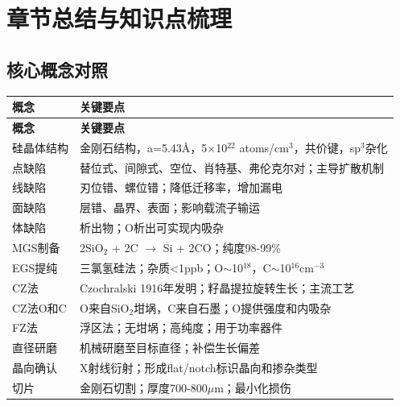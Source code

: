\documentclass[UTF8,12pt,a4paper]{ctexart}
\begin{document}
\section{章节总结与知识点梳理}

\subsection{核心概念对照}

\begin{longtable}{|L{4cm}|L{11cm}|}
\hline
\textbf{概念} & \textbf{关键要点} \\
\hline
\endfirsthead
\hline
\textbf{概念} & \textbf{关键要点} \\
\hline
\endhead
\hline
\endfoot
\hline
\endlastfoot

硅晶体结构 & 金刚石结构，a=5.43\AA，5$\times$10$^{22}$ atoms/cm$^3$，共价键，sp$^3$杂化 \\
\hline

点缺陷 & 替位式、间隙式、空位、肖特基、弗伦克尔对；主导扩散机制 \\
\hline

线缺陷 & 刃位错、螺位错；降低迁移率，增加漏电 \\
\hline

面缺陷 & 层错、晶界、表面；影响载流子输运 \\
\hline

体缺陷 & 析出物；O析出可实现内吸杂 \\
\hline

MGS制备 & 2SiO$_2$ + 2C $\rightarrow$ Si + 2CO；纯度98-99\% \\
\hline

EGS提纯 & 三氯氢硅法；杂质<1ppb；O$\sim$10$^{18}$，C$\sim$10$^{16}$cm$^{-3}$ \\
\hline

CZ法 & Czochralski 1916年发明；籽晶提拉旋转生长；主流工艺 \\
\hline

CZ法O和C & O来自SiO$_2$坩埚，C来自石墨；O提供强度和内吸杂 \\
\hline

FZ法 & 浮区法；无坩埚；高纯度；用于功率器件 \\
\hline

直径研磨 & 机械研磨至目标直径；补偿生长偏差 \\
\hline

晶向确认 & X射线衍射；形成flat/notch标识晶向和掺杂类型 \\
\hline

切片 & 金刚石切割；厚度700-800$\mu$m；最小化损伤 \\
\hline


\end{longtable}
\end{document}
